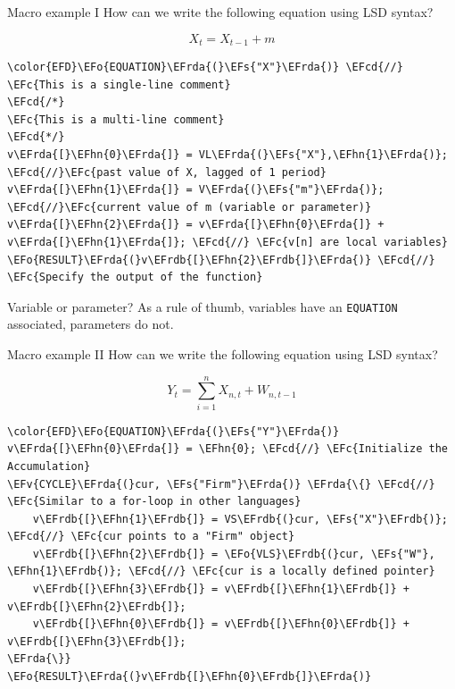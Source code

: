 \documentclass[bigger,aspectratio=169]{beamer}
\newcommand{\EFc}[1]{\textcolor{EFc}{#1}} %
\newcommand{\EFcd}[1]{\textcolor{EFcd}{#1}} %
\newcommand{\EFs}[1]{\textcolor{EFs}{#1}} %
\newcommand{\EFv}[1]{\textcolor{EFv}{#1}} %
\newcommand{\EFo}[1]{\textcolor{EFo}{#1}} %
\newcommand{\EFhn}[1]{\textcolor{EFhn}{\textbf{#1}}} %
\newcommand{\EFrda}[1]{\textcolor{EFrda}{#1}} %
\newcommand{\EFrdb}[1]{\textcolor{EFrdb}{#1}} %
\begin{document}
\begin{frame}[label={sec:org60bfbd4},fragile]{Macro example I}
 How can we write the following equation using LSD syntax?

\[X_{t} = X_{t-1} + m\]

\begin{Code}
\begin{Verbatim}
\color{EFD}\EFo{EQUATION}\EFrda{(}\EFs{"X"}\EFrda{)} \EFcd{//} \EFc{This is a single-line comment}
\EFcd{/*}
\EFc{This is a multi-line comment}
\EFcd{*/}
v\EFrda{[}\EFhn{0}\EFrda{]} = VL\EFrda{(}\EFs{"X"},\EFhn{1}\EFrda{)}; \EFcd{//}\EFc{past value of X, lagged of 1 period}
v\EFrda{[}\EFhn{1}\EFrda{]} = V\EFrda{(}\EFs{"m"}\EFrda{)}; \EFcd{//}\EFc{current value of m (variable or parameter)}
v\EFrda{[}\EFhn{2}\EFrda{]} = v\EFrda{[}\EFhn{0}\EFrda{]} + v\EFrda{[}\EFhn{1}\EFrda{]}; \EFcd{//} \EFc{v[n] are local variables}
\EFo{RESULT}\EFrda{(}v\EFrdb{[}\EFhn{2}\EFrdb{]}\EFrda{)} \EFcd{//} \EFc{Specify the output of the function}
\end{Verbatim}
\end{Code}
\begin{block}{Variable or parameter?}
As a rule of thumb, variables have an \texttt{EQUATION} associated, parameters do not.
\end{block}
\end{frame}
\begin{frame}[label={sec:orgc2b0ded},fragile]{Macro example II}
 How can we write the following equation using LSD syntax?

\[Y_{t} = \sum_{i=1}^{n} X_{n,t} + W_{n,t-1}\]



\begin{Code}
\begin{Verbatim}
\color{EFD}\EFo{EQUATION}\EFrda{(}\EFs{"Y"}\EFrda{)}
v\EFrda{[}\EFhn{0}\EFrda{]} = \EFhn{0}; \EFcd{//} \EFc{Initialize the Accumulation}
\EFv{CYCLE}\EFrda{(}cur, \EFs{"Firm"}\EFrda{)} \EFrda{\{} \EFcd{//} \EFc{Similar to a for-loop in other languages}
    v\EFrdb{[}\EFhn{1}\EFrdb{]} = VS\EFrdb{(}cur, \EFs{"X"}\EFrdb{)}; \EFcd{//} \EFc{cur points to a "Firm" object}
    v\EFrdb{[}\EFhn{2}\EFrdb{]} = \EFo{VLS}\EFrdb{(}cur, \EFs{"W"}, \EFhn{1}\EFrdb{)}; \EFcd{//} \EFc{cur is a locally defined pointer}
    v\EFrdb{[}\EFhn{3}\EFrdb{]} = v\EFrdb{[}\EFhn{1}\EFrdb{]} + v\EFrdb{[}\EFhn{2}\EFrdb{]};
    v\EFrdb{[}\EFhn{0}\EFrdb{]} = v\EFrdb{[}\EFhn{0}\EFrdb{]} + v\EFrdb{[}\EFhn{3}\EFrdb{]};
\EFrda{\}}
\EFo{RESULT}\EFrda{(}v\EFrdb{[}\EFhn{0}\EFrdb{]}\EFrda{)}
\end{Verbatim}
\end{Code}
\end{frame}
\end{document}
